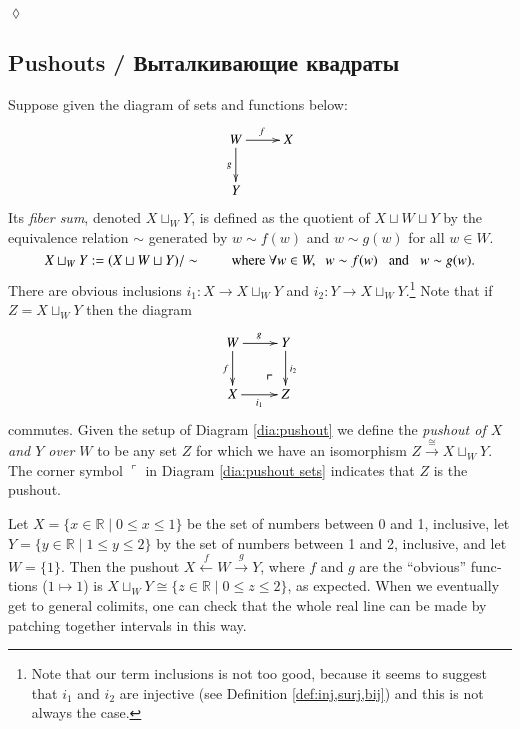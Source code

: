 \documentclass[a4paper]{book}
\makeatletter
\def\tn{\textnormal}
\def\RR{{\mathbb R}}
\def\hsp{\hspace{.3in}}
\def\to{\rightarrow}
\def\taking{\colon}
\def\iso{\cong}
\def\|{{\;|\;}}
\def\lrlimit{\ar@{}[lu]|(.3)*+{\ulcorner}}
\newcommand{\To}[1]{\xrightarrow{#1}}
\newcommand{\From}[1]{\xleftarrow{#1}}
\theoremstyle{myth}
\newtheorem{exampleENG}[envENG]{\begin{english}Example\end{english}}
\newtheorem{definitionENG}[envENG]{\begin{english}Definition\end{english}}
\newtheorem{excRUS}[envRUS]{\begin{russian}Упражнение\end{russian}}
\newtheorem{definitionRUS}[envRUS]{\begin{russian}Определение\end{russian}}
\newenvironment{exerciseRUS}{\begin{excRUS}}{\hspace*{\fill}$\lozenge$\end{excRUS}}
\makeatother
\begin{document}
\begin{english}
\begin{exerciseRUS}
\begin{russian} \end{russian}
\end{exerciseRUS}


\subsection{Pushouts / Выталкивающие квадраты}\label{sec:pushouts}

\begin{definitionENG}[Pushout]\label{def:pushout}
Suppose given the diagram of sets and functions below:
\begin{align}\label{dia:pushout}
\xymatrix{W\ar[r]^f\ar[d]_g&X\\Y}
\end{align}
Its {\em fiber sum}, denoted $X\sqcup_WY$, is defined as the quotient of $X\sqcup W\sqcup Y$ by the equivalence relation $\sim$ generated by $w\sim f(w)$ and $w\sim g(w)$ for all $w\in W$.
$$X\sqcup_WY:=(X\sqcup W\sqcup Y)/\sim \hsp\tn{where } \forall w\in W,\;\;  w\sim f(w)\;\;\tn{ and }\;\; w\sim g(w).$$ 
There are obvious inclusions $i_1\taking X\to X\sqcup_WY$ and $i_2\taking Y\to X\sqcup_WY$.\footnote{Note that our term inclusions is not too good, because it seems to suggest that $i_1$ and $i_2$ are injective (see Definition \ref{def:inj,surj,bij}) and this is not always the case.}
Note that if $Z=X\sqcup_WY$ then the diagram
\begin{align}\label{dia:pushout sets}
\xymatrix{W\ar[r]^g\ar[d]_f&Y\ar[d]^{i_2}\\X\ar[r]_-{i_1}&Z\lrlimit}
\end{align} 
commutes. Given the setup of Diagram \ref{dia:pushout} we define the {\em pushout of $X$ and $Y$ over $W$} to be any set $Z$ for which we have an isomorphism $Z\To{\iso}X\sqcup_WY$. The corner symbol $\ulcorner$ in Diagram \ref{dia:pushout sets} indicates that $Z$ is the pushout.
\end{definitionENG}

\begin{definitionRUS}\label{def:pushout}
\begin{russian} \end{russian}
\end{definitionRUS}

\begin{exampleENG}
Let $X=\{x\in\RR\|0\leq x\leq1\}$ be the set of numbers between 0 and 1, inclusive, let $Y=\{y\in\RR\|1\leq y\leq 2\}$ by the set of numbers between 1 and 2, inclusive, and let $W=\{1\}$. Then the pushout $X\From{f} W\To{g} Y$, where $f$ and $g$ are the “obvious” functions ($1\mapsto 1$) is $X\sqcup_WY\iso\{z\in\RR\|0\leq z\leq 2\}$, as expected. When we eventually get to general colimits, one can check that the whole real line can be made by patching together intervals in this way.
\end{exampleENG}


\end{english}
\end{document}
